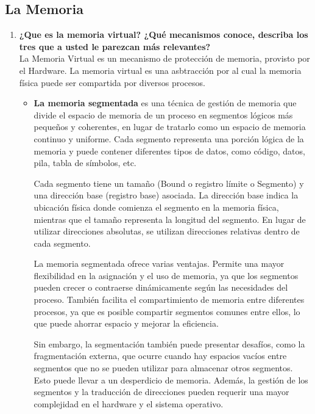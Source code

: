 \documentclass[../main.tex]{subfiles}
\begin{document}
    \subsection{La Memoria}
        \begin{enumerate}
            \item 
                \textbf{¿Que es la memoria virtual? ¿Qué mecanismos conoce, describa los tres que a usted le parezcan más relevantes?}\\
                La Memoria Virtual es un mecanismo de protección de memoria, provisto por el Hardware. La memoria virtual es una asbtracción por al cual la memoria física puede ser compartida por diversos procesos.
                \begin{itemize}
                    \item 
                        \textbf{La memoria segmentada} es una técnica de gestión de memoria que divide el espacio de memoria de un proceso en segmentos lógicos más pequeños y coherentes, en lugar de tratarlo como un espacio de memoria continuo y uniforme. Cada segmento representa una porción lógica de la memoria y puede contener diferentes tipos de datos, como código, datos, pila, tabla de símbolos, etc.

                        Cada segmento tiene un tamaño (Bound o registro límite o Segmento) y una dirección base (registro base) asociada. La dirección base indica la ubicación física donde comienza el segmento en la memoria física, mientras que el tamaño representa la longitud del segmento. En lugar de utilizar direcciones absolutas, se utilizan direcciones relativas dentro de cada segmento.
                        
                        La memoria segmentada ofrece varias ventajas. Permite una mayor flexibilidad en la asignación y el uso de memoria, ya que los segmentos pueden crecer o contraerse dinámicamente según las necesidades del proceso. También facilita el compartimiento de memoria entre diferentes procesos, ya que es posible compartir segmentos comunes entre ellos, lo que puede ahorrar espacio y mejorar la eficiencia.
                        
                        Sin embargo, la segmentación también puede presentar desafíos, como la fragmentación externa, que ocurre cuando hay espacios vacíos entre segmentos que no se pueden utilizar para almacenar otros segmentos. Esto puede llevar a un desperdicio de memoria. Además, la gestión de los segmentos y la traducción de direcciones pueden requerir una mayor complejidad en el hardware y el sistema operativo.
                        

\end{itemize}
\end{enumerate}
\end{document}
